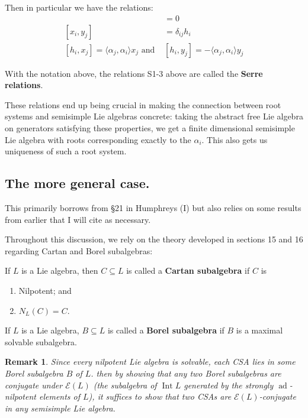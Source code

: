 \documentclass[12pt]{article}
\theoremstyle{nonumberbreak}
\theoremstyle{changebreak}
\theoremstyle{nonumberplain}
\theoremstyle{change}
\newtheorem{rmk}[thm]{Remark}
\DeclareMathOperator{\ad}{ad}
\DeclareMathOperator{\Int}{Int}
\begin{document}
Then in particular we have the relations:
\begin{align*}
	[h_i,h_j]&=0\tag{S1}\\
	[x_i,y_j]&=\delta_{ij}h_i\tag{S2}\\
	[h_i,x_j]=\langle\alpha_j,\alpha_i\rangle x_j\text{ and }& [h_i,y_j]=-\langle\alpha_j,\alpha_i\rangle y_j\tag{S3}
\end{align*}
\begin{defn}
	With the notation above, the relations S1-3 above are called the \textbf{Serre relations}.
\end{defn}	

These relations end up being crucial in making the connection between root systems and semisimple Lie algebras concrete:
taking the abstract free Lie algebra on generators satisfying these properties, we get a finite dimensional semisimple Lie algebra
with roots corresponding exactly to the $\alpha_i$. This also gets us uniqueness of such a root system.

\subsection{The more general case.}
This primarily borrows from \S 21 in Humphreys (I) but also relies on some results from earlier that I will cite as 
necessary. 

Throughout this discussion, we rely on the theory developed in sections 15 and 16 regarding Cartan and Borel subalgebras:
\begin{defn}
	If $L$ is a Lie algebra, then $C\subseteq L$ is called a \textbf{Cartan subalgebra} if $C$ is
	\begin{enumerate}
		\item Nilpotent; and
		\item $N_L(C)=C$.
	\end{enumerate}
\end{defn}
\begin{defn}
	If $L$ is a Lie algebra, $B\subseteq L$ is called a \textbf{Borel subalgebra} if $B$ is a
	maximal solvable subalgebra.
\end{defn}
\begin{rmk}
	Since every nilpotent Lie algebra is solvable, each CSA lies in some Borel subalgebra $B$ of $L$.
	then by showing that any two Borel subalgebras are conjugate under $\mathscr{E}(L)$ (the subalgebra of $\Int L$ generated
	by the strongly $\ad$-nilpotent elements of $L$), it suffices to 
	show that two CSAs are $\mathscr{E}(L)$-conjugate in any \textit{semisimple} Lie algebra.
\end{rmk}
\end{document}
